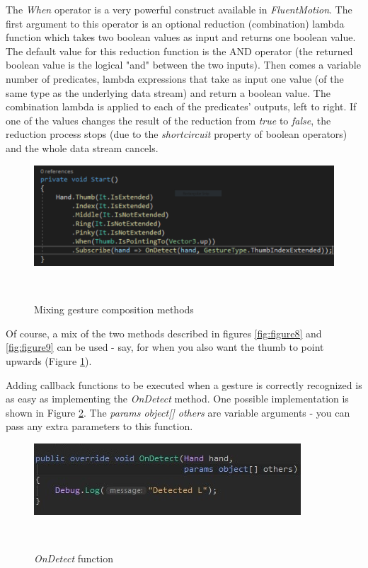 \documentclass{sigchi}
\def\fluentmotion{\textit{FluentMotion}}
\begin{document}
The \textit{When} operator is a very powerful construct available in \fluentmotion{}. The first argument to this operator is an optional reduction (combination) lambda function which takes two boolean values as input and returns one boolean value. The default value for this reduction function is the AND operator (the returned boolean value is the logical "and" between the two inputs). Then comes a variable number of predicates, lambda expressions that take as input one value (of the same type as the underlying data stream) and return a boolean value. The combination lambda is applied to each of the predicates' outputs, left to right. If one of the values changes the result of the reduction from \textit{true} to \textit{false}, the reduction process stops (due to the \textit{shortcircuit} property of boolean operators) and the whole data stream cancels.

\begin{figure}[!t]
  \centering
  \includegraphics[width=1.0\columnwidth]{figures/Alternate_script}
  \caption{Mixing gesture composition methods}~\label{fig:mix}
\end{figure}

Of course, a mix of the two methods described in figures \ref{fig:figure8} and \ref{fig:figure9} can be used - say, for when you also want the thumb to point upwards (Figure \ref{fig:mix}).

Adding callback functions to be executed when a gesture is correctly recognized is as easy as implementing the \textit{OnDetect} method. One possible implementation is shown in Figure \ref{fig:figure10}. The \textit{params object[] others} are variable arguments - you can pass any extra parameters to this function.

\begin{figure}[h]
  \centering
  \includegraphics[width=0.9\columnwidth]{figures/FluentMotion_onDetect}
  \caption{\textit{OnDetect} function}~\label{fig:figure10}
\end{figure}
\end{document}
